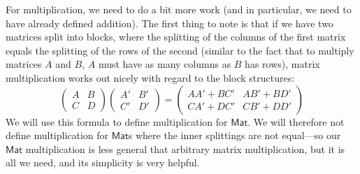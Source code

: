 \documentclass{article}
\newcommand{\Conid}[1]{\mathit{#1}}
\newcommand{\Varid}[1]{\mathit{#1}}
\def\resethooks{%
  \global\let\SaveRestoreHook\empty
  \global\let\ColumnHook\empty}
\let\hspre\empty
\let\hspost\empty
\renewcommand\Varid[1]{\mathord{\textsf{#1}}}
\let\Conid\Varid
\begin{document}
\resethooks

For multiplication, we need to do a bit more work (and in particular, we need to have already defined addition). The first thing to note is that if we have two matrices split into blocks, where the splitting of the columns of the first matrix equals the splitting of the rows of the second (similar to the fact that to multiply matrices $A$ and $B$, $A$ must  have as many columns as $B$ has rows), matrix multiplication works out nicely with regard to the block structures:
\begin{equation}
\begin{pmatrix}
A & B \\
C & D 
\end{pmatrix}
\begin{pmatrix}
A' & B' \\
C' & D'
\end{pmatrix}
=
\begin{pmatrix}
A A' + B C'    &    A B' + B D' \\
C A' + D C'    &    C B' + D D'
\end{pmatrix}
\end{equation}
We will use this formula to define multiplication for \ensuremath{\Conid{Mat}}. We will therefore not define multiplication for \ensuremath{\Conid{Mat}}s where the inner splittings are not equal---so our \ensuremath{\Conid{Mat}} multiplication is less general that arbitrary matrix multiplication, but it is all we need, and its simplicity is very helpful.
\end{document}

